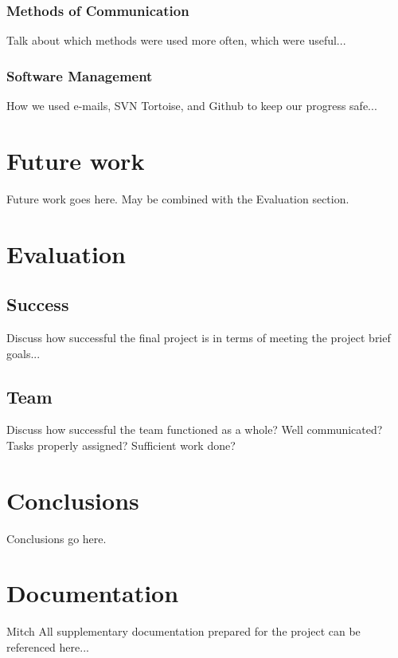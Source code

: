 \documentclass[oneside]{ecsgdp}         %
\begin{document}
\subsection{Methods of Communication}
Talk about which methods were used more often, which were useful...

\subsection{Software Management}
How we used e-mails, SVN Tortoise, and Github to keep our progress safe...


\chapter{Future work}
Future work goes here. May be combined with the Evaluation section.

\chapter{Evaluation}

\section{Success}
Discuss how successful the final project is in terms of meeting the project brief goals...

\section{Team}
Discuss how successful the team functioned as a whole? Well communicated? Tasks properly assigned? Sufficient work done?

\chapter{Conclusions}
Conclusions go here.

\chapter{Documentation}
Mitch
All supplementary documentation prepared for the project can be referenced here...
\end{document}
